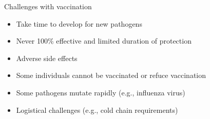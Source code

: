 \documentclass[
  ignorenonframetext,
]{beamer}
\providecommand{\tightlist}{%
  \setlength{\itemsep}{0pt}\setlength{\parskip}{0pt}}\usepackage{longtable,booktabs,array}
\begin{document}
\begin{frame}
\begin{block}{Challenges with vaccination}
\label{challenges-with-vaccination}
\begin{itemize}
\tightlist
\item
  Take time to develop for new pathogens
\item
  Never 100\% effective and limited duration of protection
\item
  Adverse side effects
\item
  Some individuals cannot be vaccinated or refuce vaccination
\item
  Some pathogens mutate rapidly (e.g., influenza virus)
\item
  Logistical challenges (e.g., cold chain requirements)
\end{itemize}
\end{block}
\end{frame}
\end{document}
